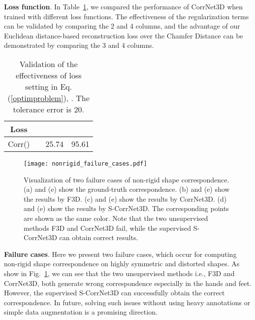 \documentclass[final]{cvpr}
\begin{document}
\textbf{Loss function}. In Table~\ref{table:loss}, we compared the performance of CorrNet3D when trained with different loss functions. The effectiveness of the regularization terms can be validated by comparing the 2 and 4 columns, and the advantage of our Euclidean distance-based reconstruction loss over the Chamfer Distance can be demonstrated by comparing the 3 and 4 columns. 




\begin{table}[t]
  \centering
  \caption{Validation of the effectiveness of loss setting in Eq. (\ref{optimproblem}),   . The tolerance error is 20.}
  \label{table:loss}
  \begin{tabular}{c||c|c|c}
\toprule[1.5pt]
  Loss       &     &   &    \\ \hline
Corr() &     & 25.74       &95.61                  \\ 
\bottomrule[1.5pt]
  \end{tabular}
\end{table}




 \begin{figure}[t]
  \centering
  \texttt{[image: nonrigid\_failure\_cases.pdf]}
  \caption{Visualization of two failure cases of non-rigid shape correspondence. (a) and (e) show the ground-truth correspondence. (b) and (e) show the results by F3D. (c) and (e) show the results by CorrNet3D. (d) and (e) show the results by S-CorrNet3D. 
  The corresponding points are shown as the same color. Note that the two unsupervised methods F3D and CorrNet3D fail, while the supervised S-CorrNet3D can obtain correct results.}
  \label{nonrigid_failure_cases}
  \vspace{-0.4cm}
 \end{figure}

\textbf{Failure cases}. Here we present two failure cases, which occur for computing non-rigid shape correspondence on highly symmetric and distorted shapes.  As show in Fig.~\ref{nonrigid_failure_cases},  we can see that the two unsupervised methods i.e., F3D and CorrNet3D, both generate wrong correspondence especially in the hands and feet. However, the supervised S-CorrNet3D can successfully obtain the correct correspondence. In future,  solving such issues without using heavy annotations or simple data augmentation is a promising direction. 
\end{document}
